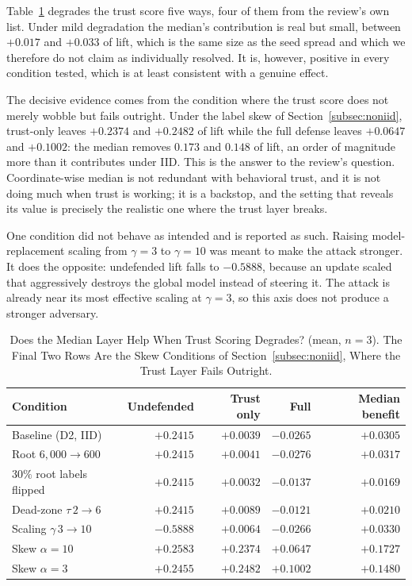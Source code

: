 \documentclass[journal]{IEEEtran}
\begin{document}
Table~\ref{tab:mediannec} degrades the trust score five ways, four of them from the review's own list. Under mild degradation the median's contribution is real but small, between $+0.017$ and $+0.033$ of lift, which is the same size as the seed spread and which we therefore do not claim as individually resolved. It is, however, positive in every condition tested, which is at least consistent with a genuine effect.

The decisive evidence comes from the condition where the trust score does not merely wobble but fails outright. Under the label skew of Section~\ref{subsec:noniid}, trust-only leaves $+0.2374$ and $+0.2482$ of lift while the full defense leaves $+0.0647$ and $+0.1002$: the median removes $0.173$ and $0.148$ of lift, an order of magnitude more than it contributes under IID. This is the answer to the review's question. Coordinate-wise median is not redundant with behavioral trust, and it is not doing much when trust is working; it is a backstop, and the setting that reveals its value is precisely the realistic one where the trust layer breaks.

One condition did not behave as intended and is reported as such. Raising model-replacement scaling from $\gamma = 3$ to $\gamma = 10$ was meant to make the attack stronger. It does the opposite: undefended lift falls to $-0.5888$, because an update scaled that aggressively destroys the global model instead of steering it. The attack is already near its most effective scaling at $\gamma = 3$, so this axis does not produce a stronger adversary.

\begin{table}[!t]
\renewcommand{\arraystretch}{1.2}
\caption{Does the Median Layer Help When Trust Scoring Degrades? (mean, $n=3$). The Final Two Rows Are the Skew Conditions of Section~\ref{subsec:noniid}, Where the Trust Layer Fails Outright.}
\label{tab:mediannec}
\centering
\footnotesize
\setlength{\tabcolsep}{3pt}
\begin{tabular}{@{}l rrrr@{}}
\toprule
\textbf{Condition} & \textbf{Undefended} & \textbf{Trust only} & \textbf{Full} & \textbf{Median benefit} \\
\midrule
Baseline (D2, IID)          & $+0.2415$ & $+0.0039$ & $-0.0265$ & $+0.0305$ \\
Root $6{,}000 \to 600$      & $+0.2415$ & $+0.0041$ & $-0.0276$ & $+0.0317$ \\
$30\%$ root labels flipped  & $+0.2415$ & $+0.0032$ & $-0.0137$ & $+0.0169$ \\
Dead-zone $\tau\,2 \to 6$   & $+0.2415$ & $+0.0089$ & $-0.0121$ & $+0.0210$ \\
Scaling $\gamma\,3 \to 10$  & $-0.5888$ & $+0.0064$ & $-0.0266$ & $+0.0330$ \\
\midrule
Skew $\alpha{=}10$          & $+0.2583$ & $+0.2374$ & $+0.0647$ & $\mathbf{+0.1727}$ \\
Skew $\alpha{=}3$           & $+0.2455$ & $+0.2482$ & $+0.1002$ & $\mathbf{+0.1480}$ \\
\bottomrule
\end{tabular}
\end{table}
\end{document}
